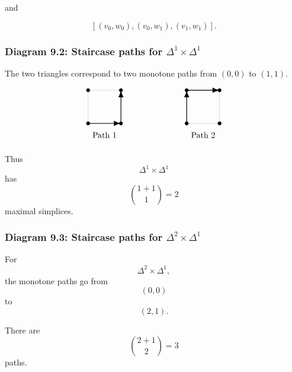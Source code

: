 \documentclass[12pt,a4paper]{article}
\theoremstyle{notespace}
\begin{document}
and

\[
[(v_0,w_0),(v_0,w_1),(v_1,w_1)].
\]

\subsubsection{Diagram 9.2: Staircase paths for \(\Delta^1\times\Delta^1\)}

The two triangles correspond to two monotone paths from \((0,0)\) to \((1,1)\).

\[
\begin{tikzpicture}[scale=1.4]
	\draw[step=1,gray!50,thin] (0,0) grid (1,1);
	\filldraw (0,0) circle (1.5pt);
	\filldraw (1,0) circle (1.5pt);
	\filldraw (0,1) circle (1.5pt);
	\filldraw (1,1) circle (1.5pt);
	\draw[-{Latex[length=3mm]},thick] (0,0) -- (1,0);
	\draw[-{Latex[length=3mm]},thick] (1,0) -- (1,1);
	\node at (0.5,-0.35) {Path 1};
	
	\begin{scope}[xshift=3cm]
		\draw[step=1,gray!50,thin] (0,0) grid (1,1);
		\filldraw (0,0) circle (1.5pt);
		\filldraw (1,0) circle (1.5pt);
		\filldraw (0,1) circle (1.5pt);
		\filldraw (1,1) circle (1.5pt);
		\draw[-{Latex[length=3mm]},thick] (0,0) -- (0,1);
		\draw[-{Latex[length=3mm]},thick] (0,1) -- (1,1);
		\node at (0.5,-0.35) {Path 2};
	\end{scope}
\end{tikzpicture}
\]

Thus
\[
\Delta^1\times\Delta^1
\]
has
\[
\binom{1+1}{1}=2
\]
maximal simplices.

\subsubsection{Diagram 9.3: Staircase paths for \(\Delta^2\times\Delta^1\)}

For
\[
\Delta^2\times\Delta^1,
\]
the monotone paths go from
\[
(0,0)
\]
to
\[
(2,1).
\]

There are
\[
\binom{2+1}{2}=3
\]
paths.
\end{document}
